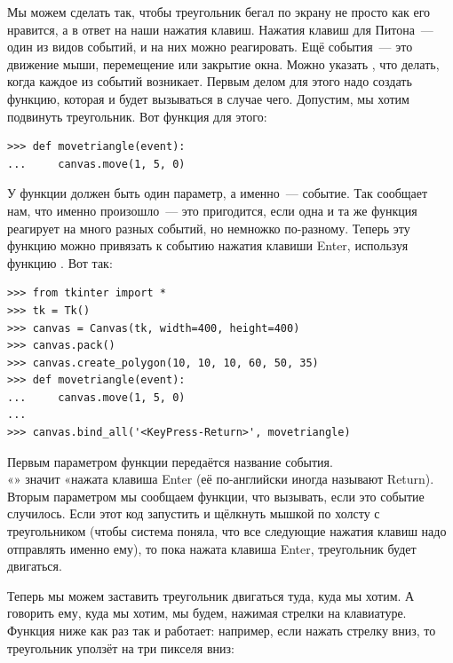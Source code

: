 Мы можем сделать так, чтобы треугольник бегал по экрану не просто как его нравится, а в ответ на наши нажатия клавиш. Нажатия клавиш для Питона — один из видов событий, и на них можно реагировать. Ещё события — это движение мыши, перемещение или закрытие окна. Можно указать , что делать, когда каждое из событий возникает. Первым делом для этого надо создать функцию, которая и будет вызываться в случае чего. Допустим, мы хотим подвинуть треугольник. Вот функция для этого:

\begin{listing}
\begin{verbatim}
>>> def movetriangle(event):
...     canvas.move(1, 5, 0)
\end{verbatim}
\end{listing}

У функции должен быть один параметр, а именно — событие. Так  сообщает нам, что именно произошло — это пригодится, если одна и та же функция реагирует на много разных событий, но немножко по-разному. Теперь эту функцию можно привязать к событию нажатия клавиши Enter, используя функцию . Вот так:

\begin{listing}
\begin{verbatim}
>>> from tkinter import *
>>> tk = Tk()
>>> canvas = Canvas(tk, width=400, height=400)
>>> canvas.pack()
>>> canvas.create_polygon(10, 10, 10, 60, 50, 35)
>>> def movetriangle(event):
...     canvas.move(1, 5, 0)
...
>>> canvas.bind_all('<KeyPress-Return>', movetriangle)
\end{verbatim}
\end{listing}

Первым параметром функции  передаётся название события. \\«» значит «нажата клавиша Enter (её по-английски иногда называют Return). Вторым параметром мы сообщаем функции, что вызывать, если это событие случилось. Если этот код запустить и щёлкнуть мышкой по холсту с треугольником (чтобы система поняла, что все следующие нажатия клавиш надо отправлять именно ему), то пока нажата клавиша Enter, треугольник будет двигаться.

Теперь мы можем заставить треугольник двигаться туда, куда мы хотим. А говорить ему, куда мы хотим, мы будем, нажимая стрелки на клавиатуре. Функция ниже как раз так и работает: например, если нажать стрелку вниз, то треугольник уползёт на три пикселя вниз:

